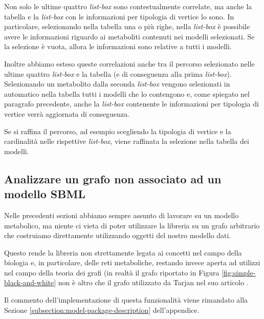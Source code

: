 Non solo le ultime quattro \emph{list-box} sono contestualmente
correlate, ma anche la tabella e la \emph{list-box} con le
informazioni per tipologia di vertice lo sono. In particolare,
selezionando nella tabella una o pi\`u righe, nella \emph{list-box}
\`e possibile avere le informazioni riguardo ai metaboliti contenuti
nei modelli selezionati. Se la selezione \`e vuota, allora le
informazioni sono relative a tutti i modelli.

Inoltre abbiamo esteso queste correlazioni anche tra il percorso
selezionato nelle ultime quattro \emph{list-box} e la tabella (e di
conseguenza alla prima \emph{list-box}). Selezionando un metabolito
dalla seconda \emph{list-box} vengono selezionati in automatico nella
tabella tutti i modelli che lo contengono e, come spiegato nel
paragrafo precedente, anche la \emph{list-box} contenente le
informazioni per tipologia di vertice verr\`a aggiornata di
conseguenza.

Se si raffina il percorso, ad esempio scegliendo la tipologia di
vertice e la cardinalit\`a nelle rispettive \emph{list-box}, viene
raffinata la selezione nella tabella dei modelli.

\subsection{Analizzare un grafo non associato ad un modello SBML}
Nelle precedenti sezioni abbiamo sempre assunto di lavorare su un
modello metabolico, ma niente ci vieta di poter utilizzare la libreria
su un grafo arbitrario che costruiamo direttamente utilizzando oggetti
del nostro modello dati.

Questo rende la libreria non strettamente legata ai concetti nel campo
della biologia e, in particolare, delle reti metaboliche, restando
invece aperta ad utilizzi nel campo della teoria dei grafi (in
realt\`a il grafo riportato in Figura \ref{fig:simple-black-and-white}
non \`e altro che il grafo utilizzato da Tarjan nel suo articolo
\cite{Tarjan}.

Il commento dell'implementazione di questa funzionalit\`a viene
rimandato alla Sezione \ref{subsection:model-package-description}
dell'appendice.


